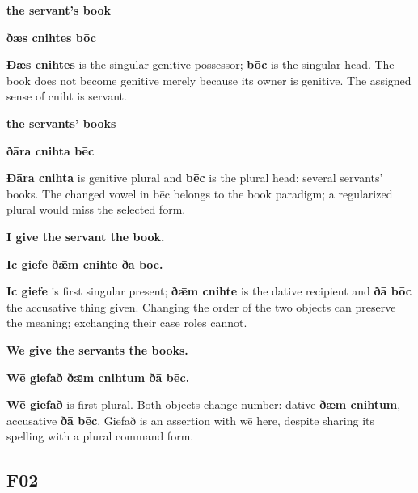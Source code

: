 \textbf{the servant's book}

\textbf{ðæs cnihtes bōc}

\textbf{Ðæs cnihtes} is the singular genitive possessor; \textbf{bōc} is the singular head. The book does not become genitive merely because its owner is genitive. The assigned sense of cniht is servant.

\textbf{the servants' books}

\textbf{ðāra cnihta bēc}

\textbf{Ðāra cnihta} is genitive plural and \textbf{bēc} is the plural head: several servants' books. The changed vowel in bēc belongs to the book paradigm; a regularized plural would miss the selected form.

\textbf{I give the servant the book.}

\textbf{Ic giefe ðǣm cnihte ðā bōc.}

\textbf{Ic giefe} is first singular present; \textbf{ðǣm cnihte} is the dative recipient and \textbf{ðā bōc} the accusative thing given. Changing the order of the two objects can preserve the meaning; exchanging their case roles cannot.

\textbf{We give the servants the books.}

\textbf{Wē giefað ðǣm cnihtum ðā bēc.}

\textbf{Wē giefað} is first plural. Both objects change number: dative \textbf{ðǣm cnihtum}, accusative \textbf{ðā bēc}. Giefað is an assertion with wē here, despite sharing its spelling with a plural command form.

\subsection*{F02}


